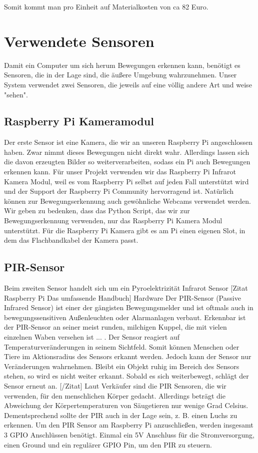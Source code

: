 \documentclass[12pt,a4paper]{scrreprt}
\begin{document}
Somit kommt man pro Einheit auf Materialkosten von ca 82 Euro.

\section{Verwendete Sensoren}
Damit ein Computer um sich herum Bewegungen erkennen kann, benötigt es Sensoren, die in der Lage sind, die äußere Umgebung wahrzunehmen. Unser System verwendet zwei Sensoren, die jeweils auf eine völlig andere Art und weise "sehen".


\subsection{Raspberry Pi Kameramodul}
Der erste Sensor ist eine Kamera, die wir an unseren Raspberry Pi angeschlossen haben. Zwar nimmt dieses Bewegungen nicht direkt wahr. Allerdings lassen sich die davon erzeugten Bilder so weiterverarbeiten, sodass ein Pi auch Bewegungen erkennen kann. Für unser Projekt verwenden wir das Raspberry Pi Infrarot Kamera Modul, weil es vom Raspberry Pi selbst auf jeden Fall unterstützt wird und der Support der Raspberry Pi Community hervorragend ist. Natürlich können zur Bewegungserkennung auch gewöhnliche Webcams verwendet werden. Wir geben zu bedenken, dass das Python Script, das wir zur Bewegungserkennung verwenden, nur das Raspberry Pi Kamera Modul unterstützt.
Für die Raspberry Pi Kamera gibt es am Pi einen eigenen Slot, in dem das Flachbandkabel der Kamera passt.

\subsection{PIR-Sensor}
Beim zweiten Sensor handelt sich um ein Pyroelektrizität Infrarot Sensor
[Zitat Raspberry Pi Das umfassende Handbuch] Hardware
Der PIR-Sensor (Passive Infrared Sensor) ist einer der gängisten Bewegungsmelder
und ist oftmals auch in bewegungssensitiven Außenleuchten oder Alarmanlagen verbaut.
Erkennbar ist der PIR-Sensor an seiner meist runden, milchigen Kuppel, die mit
vielen einzelnen Waben versehen ist ... . Der Sensor reagiert auf
Temperaturveränderungen in seinem Sichtfeld. Somit können Menschen oder Tiere
im Aktionsradius des Sensors erkannt werden. Jedoch kann der Sensor nur Veränderungen
wahrnehmen. Bleibt ein Objekt ruhig im Bereich des Sensors stehen, so wird
es nicht weiter erkannt. Sobald es sich weiterbewegt, schlägt der Sensor erneut an. [/Zitat]
Laut Verkäufer sind die PIR Sensoren, die wir verwenden, für den menschlichen Körper gedacht.
Allerdings beträgt die Abweichung der Körpertemperaturen von Säugetieren nur wenige Grad Celsius.
Dementsprechend sollte der PIR auch in der Lage sein, z. B. einen Luchs zu erkennen.
Um den PIR Sensor am Raspberry Pi anzuschließen, werden insgesamt 3 GPIO Anschlüssen benötigt.
Einmal ein 5V Anschluss für die Stromversorgung, einen Ground und ein regulärer GPIO Pin, um den PIR zu steuern.
\end{document}
